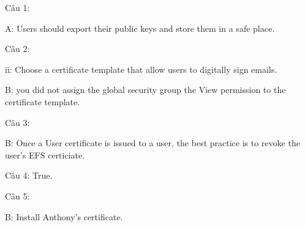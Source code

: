 \noindent Câu 1: 

A: Users should export their public keys and store them in a safe place.

\noindent Câu 2: 

ii: Choose a certificate template that allow users to digitally sign emails.

B: you did not assign the global security group the View permission to the certificate template.

\noindent Câu 3: 

B: Once a User certificate is issued to a user, the best practice is to revoke the user's EFS certiciate.

\noindent Câu 4: True.

\noindent Câu 5:

B: Install Anthony's certificate.